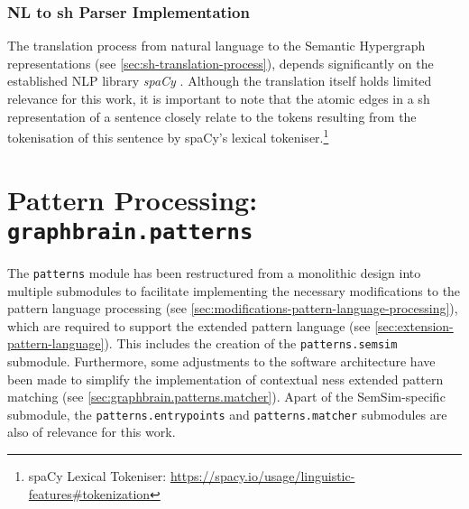 \documentclass[11pt]{scrreprt}
\let\cite\parencite  %
\begin{document}
\subsubsection{NL to \gls{sh} Parser Implementation}
\label{sec:nl-to-sh-parser-implementation}
The translation process from natural language to the Semantic Hypergraph representations (see \cref{sec:sh-translation-process}), depends significantly on the established NLP library \textit{spaCy} \cite{honnibal2020spacy}. Although the translation itself holds limited relevance for this work, it is important to note that the atomic edges in a \gls{sh} representation of a sentence closely relate to the tokens resulting from the tokenisation of this sentence by spaCy's lexical tokeniser.\footnote{spaCy Lexical Tokeniser: \url{https://spacy.io/usage/linguistic-features\#tokenization}}


%
%


\section{Pattern Processing: \texttt{graphbrain.patterns}}
The \texttt{patterns} module has been restructured from a monolithic design into multiple submodules to facilitate implementing the necessary modifications to the pattern language processing (see \cref{sec:modifications-pattern-language-processing}), which are required to support the extended pattern language (see \cref{sec:extension-pattern-language}). This includes the creation of the \texttt{patterns.semsim} submodule. Furthermore, some adjustments to the software architecture have been made to simplify the implementation of contextual \gls{ness} extended pattern matching (see \cref{sec:graphbrain.patterns.matcher}). Apart of the SemSim-specific submodule, the \texttt{patterns.entrypoints} and \texttt{patterns.matcher} submodules are also of relevance for this work.
\end{document}
